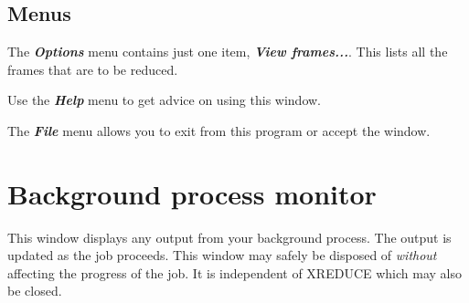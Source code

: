 \documentclass[11pt,nolof]{starlink}
\providecommand{\menu}[1]{{\bf \em #1}}
\begin{document}
\subsection{Menus }
The \menu{Options} menu contains just one item, \menu{View
frames...}. This lists all the frames that are to be reduced.

Use the \menu{Help} menu to get advice on using this window.

The \menu{File} menu allows you to exit from this program or
accept the window.

\section{Background process monitor }
This window displays any output from your background process. The
output is updated as the job proceeds. This window may safely be
disposed of {\em without} affecting the progress of the job. It is
independent of XREDUCE which may also be closed.
\end{document}

